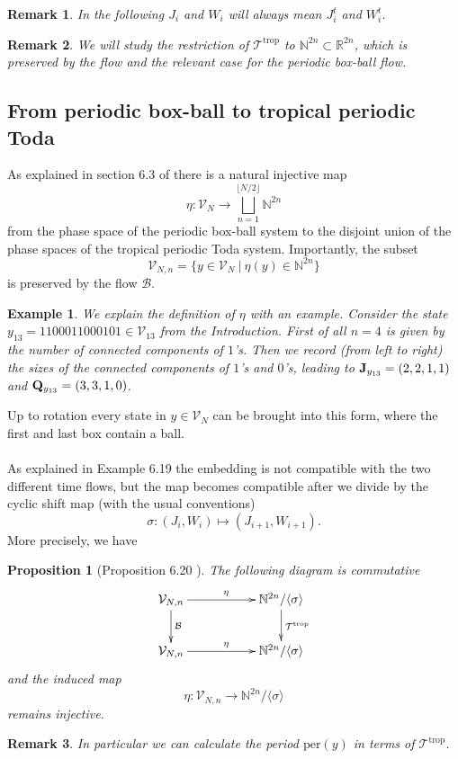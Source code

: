 \documentclass[11pt, a4paper]{amsart}
\newcommand{\eqst}[1]{\begin{equation*}#1\end{equation*}}
\theoremstyle{plain}
\newtheorem{proposition}{Proposition}[section]
\newtheorem{example}{Example}[section]
\newtheorem{remark}{Remark}[section]
\numberwithin{equation}{section}
\begin{document}
\begin{remark}
In the following $J_i$ and $W_i$ will always mean $J_i^t$ and $W_i^t$. 
\end{remark}

\begin{remark} 
We will study the restriction of $\mathcal T ^{\mathrm{trop}}$ to $\mathbb N^{2n} \subset \mathbb R^{2n}$, which is preserved by the flow and the relevant case for the periodic box-ball flow.
\end{remark}

\subsection{From periodic box-ball to tropical periodic Toda}
\label{sec-boxball-trop}
As explained in section 6.3 of \cite{inoue} there is a natural injective map \eqst{\eta : \mathcal V_N \longrightarrow \bigsqcup _{n=1}^{\lfloor N/2 \rfloor}\mathbb N^{2n}} from the phase space of the periodic box-ball system to the disjoint union of the phase spaces of the tropical periodic Toda system. Importantly, the subset \eqst{\mathcal V_{N,n} = \{y \in \mathcal V _N \ \vert \ \eta(y) \in \mathbb N^{2n}\}} is preserved by the flow $\mathcal B$. 
\begin{example}
We explain the definition of $\eta$ with an example.
Consider the state $y_{13} = 1100011000101 \in \mathcal V _{13}$ from the Introduction. First of all $n=4$ is given by the number of connected components of $1$'s. Then we record (from left to right) the sizes of the connected components of $1$'s and $0$'s, leading to $\bold J_{y_{13}} =(2,2,1,1)$ and $\bold Q_{y_{13}} = (3,3,1,0)$. 
\end{example}
\noindent Up to rotation every 
state in $y \in \mathcal V _{N}$ can be brought into this form, where the first and last box contain a ball. \\ \\
As explained in Example 6.19 \cite{inoue} the embedding is not compatible with the two different time flows, but the map becomes compatible after we divide by the cyclic shift map (with the usual conventions) \eqst{\sigma : (J_i,W_i) \longmapsto (J_{i+1},W_{i+1}).} More precisely, we have 
\begin{proposition}[Proposition 6.20 \cite{inoue}] \label{propinoue1} The following diagram is commutative 
\eqst{\xymatrix{ \mathcal V_{N,n} \ar[rr]^{\eta} \ar[d]^{\mathcal B} && \mathbb N^{2n}{/{\langle \sigma \rangle}} \ar[d]^{\mathcal T^{\mathrm{trop}}} \\ \mathcal V_{N,n} \ar[rr]^{\eta} && \mathbb N^{2n}{/{\langle \sigma \rangle}} }}
and the induced map \eqst{\eta: \mathcal V_{N,n} \longrightarrow \mathbb N^{2n}{ /{\langle \sigma \rangle}}} remains injective.
\end{proposition}
\begin{remark}
In particular we can calculate the period $\mathrm{per}(y)$ in terms of $\mathcal T^{\mathrm{trop}}$.
\end{remark}
\end{document}
